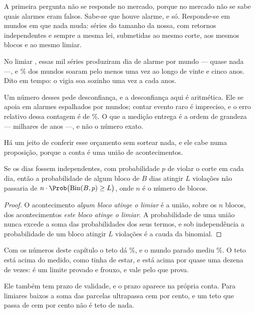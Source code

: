 A primeira pergunta não se responde no mercado, porque no mercado não se sabe quais alarmes
eram falsos. Sabe-se que houve alarme, e só. Responde-se em mundos em que nada muda:
\numVigiaMundos{} séries do tamanho da nossa, com retornos independentes e sempre a mesma
lei, submetidas ao mesmo corte, aos mesmos blocos e ao mesmo limiar.

No limiar \numVigiaLimiar{}, essas mil séries produziram \numVigiaDiasParadoPorMundo{} dia de
alarme por mundo --- quase nada ---, e \numVigiaMundosQueSoamPct\% dos mundos soaram pelo
menos uma vez ao longo de vinte e cinco anos. Dito em tempo: o vigia soa sozinho uma vez a
cada \numVigiaAnosParadoPorAlarme{} anos.

Um número desses pede desconfiança, e a desconfiança aqui é aritmética. Ele se apoia em
\numVigiaParadoAlarmes{} alarmes espalhados por \numVigiaMundos{} mundos; contar evento raro
é impreciso, e o erro relativo dessa contagem é de \numVigiaParadoErroPct\%. O que a medição
entrega é a ordem de grandeza --- milhares de anos ---, e não o número exato.

Há um jeito de conferir esse orçamento sem sortear nada, e ele cabe numa proposição, porque a
conta é uma união de acontecimentos.

\begin{proposicao}
\label{prop:teto}
Se os dias fossem independentes, com probabilidade $p$ de violar o corte em cada dia, então a
probabilidade de algum bloco de $B$ dias atingir $L$ violações não passaria de
$n \cdot \Prob\big(\text{Bin}(B, p) \geq L\big)$, onde $n$ é o número de blocos.
\end{proposicao}

\begin{proof}
O acontecimento \emph{algum bloco atinge o limiar} é a união, sobre os $n$ blocos, dos
acontecimentos \emph{este bloco atinge o limiar}. A probabilidade de uma união nunca excede a
soma das probabilidades dos seus termos, e sob independência a probabilidade de um bloco
atingir $L$ violações é a cauda da binomial.
\end{proof}

Com os números deste capítulo o teto dá \numVigiaTetoIndependentePct\%, e o mundo parado
mediu \numVigiaMundosQueSoamPct\%. O teto está acima do medido, como tinha de estar, e está
acima por quase uma dezena de vezes: é um limite provado e frouxo, e vale pelo que prova.

Ele também tem prazo de validade, e o prazo aparece na própria conta. Para limiares baixos a
soma das parcelas ultrapassa cem por cento, e um teto que passa de cem por cento não é teto de
nada.

